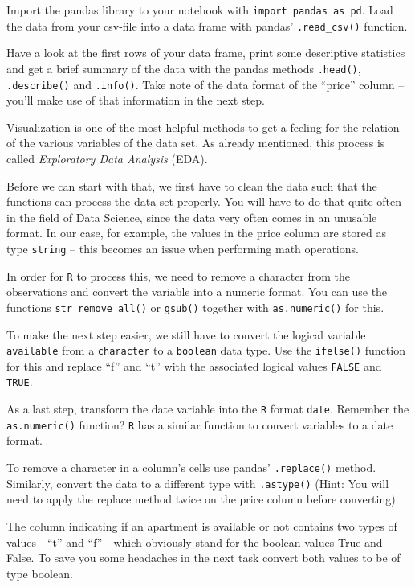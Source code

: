 \documentclass[
  11pt,
]{book}
\newenvironment{tips}[1]
  {
  \begin{itemize}
  \footnotesize
  \renewcommand{\labelitemi}{
    \raisebox{-.7\height}[0pt][0pt]{
      {\setkeys{Gin}{width=3em,keepaspectratio}
        \texttt{[image: images/\#1.png]}}
    }
  }
  \setlength{\fboxsep}{1em}
  \begin{rbox}
  \item
  }
  {
  \end{rbox}
  \end{itemize}
  }
\newenvironment{tipsp}[1]
  {
  \begin{itemize}
  \footnotesize
  \renewcommand{\labelitemi}{
    \raisebox{-.7\height}[0pt][0pt]{
      {\setkeys{Gin}{width=3em,keepaspectratio}
        \texttt{[image: images/\#1.png]}}
    }
  }
  \setlength{\fboxsep}{1em}
  \begin{pbox}
  \item
  }
  {
  \end{pbox}
  \end{itemize}
  }
\begin{document}
\begin{tipsp}p

Import the pandas library to your notebook with \texttt{import\ pandas\ as\ pd}. Load the data from your csv-file into a data frame with pandas' \texttt{.read\_csv()} function.

Have a look at the first rows of your data frame, print some descriptive statistics and get a brief summary of the data with the pandas methods \texttt{.head()}, \texttt{.describe()} and \texttt{.info()}.
Take note of the data format of the ``price'' column -- you'll make use of that information in the next step.

\end{tipsp}

Visualization is one of the most helpful methods to get a feeling for the relation of the various variables of the data set. As already mentioned, this process is called \emph{Exploratory Data Analysis} (EDA).

Before we can start with that, we first have to clean the data such that the functions can process the data set properly. You will have to do that quite often in the field of Data Science, since the data very often comes in an unusable format. In our case, for example, the values in the price column are stored as type \texttt{string} -- this becomes an issue when performing math operations.

\begin{tips}r

In order for \texttt{R} to process this, we need to remove a character from the observations and convert the variable into a numeric format. You can use the functions \texttt{str\_remove\_all()} or \texttt{gsub()} together with \texttt{as.numeric()} for this.

To make the next step easier, we still have to convert the logical variable \texttt{available} from a \texttt{character} to a \texttt{boolean} data type. Use the \texttt{ifelse()} function for this
and replace ``f'' and ``t'' with the associated logical values \texttt{FALSE} and \texttt{TRUE}.

As a last step, transform the date variable into the \texttt{R} format \texttt{date}. Remember the \texttt{as.numeric()} function? \texttt{R} has a similar function to convert variables to a date format.

\end{tips}

\begin{tipsp}p

To remove a character in a column's cells use pandas' \texttt{.replace()} method. Similarly, convert the data to a different type with \texttt{.astype()} (Hint: You will need to apply the replace method twice on the price column before converting).

The column indicating if an apartment is available or not contains two types of values - ``t'' and ``f'' - which obviously stand for the boolean values True and False. To save you some headaches in the next task convert both values to be of type boolean.

\end{tipsp}
\end{document}
